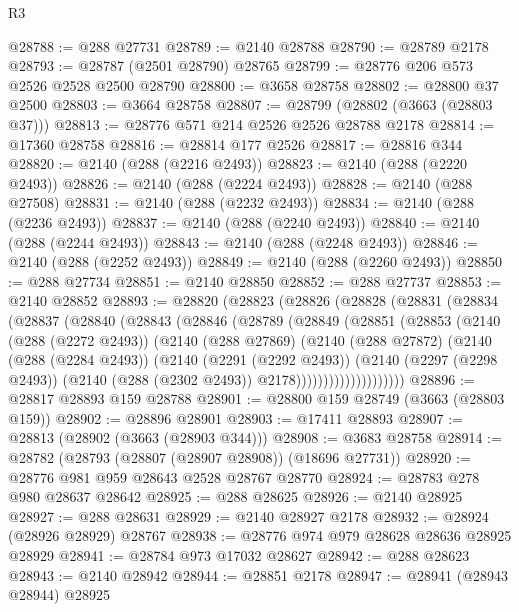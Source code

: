 \begin{lexlean}{R3}
\begin{coremodule}
@28788 := @288 @27731
@28789 := @2140 @28788
@28790 := @28789 @2178
@28793 := @28787 (@2501 @28790) @28765
@28799 := @28776 @206 @573 @2526 @2528 @2500 @28790
@28800 := @3658 @28758
@28802 := @28800 @37 @2500
@28803 := @3664 @28758
@28807 := @28799 (@28802 (@3663 (@28803 @37)))
@28813 := @28776 @571 @214 @2526 @2526 @28788 @2178
@28814 := @17360 @28758
@28816 := @28814 @177 @2526
@28817 := @28816 @344
@28820 := @2140 (@288 (@2216 @2493))
@28823 := @2140 (@288 (@2220 @2493))
@28826 := @2140 (@288 (@2224 @2493))
@28828 := @2140 (@288 @27508)
@28831 := @2140 (@288 (@2232 @2493))
@28834 := @2140 (@288 (@2236 @2493))
@28837 := @2140 (@288 (@2240 @2493))
@28840 := @2140 (@288 (@2244 @2493))
@28843 := @2140 (@288 (@2248 @2493))
@28846 := @2140 (@288 (@2252 @2493))
@28849 := @2140 (@288 (@2260 @2493))
@28850 := @288 @27734
@28851 := @2140 @28850
@28852 := @288 @27737
@28853 := @2140 @28852
@28893 := @28820
    (@28823
      (@28826
        (@28828
          (@28831
            (@28834
              (@28837
                (@28840
                  (@28843
                    (@28846
                      (@28789
                        (@28849
                          (@28851
                            (@28853
                              (@2140
                                (@288 (@2272 @2493))
                                (@2140
                                  (@288 @27869)
                                  (@2140
                                    (@288 @27872)
                                    (@2140
                                      (@288 (@2284 @2493))
                                      (@2140
                                        (@2291 (@2292 @2493))
                                        (@2140
                                          (@2297 (@2298 @2493))
                                          (@2140 (@288 (@2302 @2493)) @2178))))))))))))))))))))
@28896 := @28817 @28893 @159 @28788
@28901 := @28800 @159 @28749 (@3663 (@28803 @159))
@28902 := @28896 @28901
@28903 := @17411 @28893
@28907 := @28813 (@28902 (@3663 (@28903 @344)))
@28908 := @3683 @28758
@28914 := @28782 (@28793 (@28807 (@28907 @28908)) (@18696 @27731))
@28920 := @28776 @981 @959 @28643 @2528 @28767 @28770
@28924 := @28783 @278 @980 @28637 @28642
@28925 := @288 @28625
@28926 := @2140 @28925
@28927 := @288 @28631
@28929 := @2140 @28927 @2178
@28932 := @28924 (@28926 @28929) @28767
@28938 := @28776 @974 @979 @28628 @28636 @28925 @28929
@28941 := @28784 @973 @17032 @28627
@28942 := @288 @28623
@28943 := @2140 @28942
@28944 := @28851 @2178
@28947 := @28941 (@28943 @28944) @28925

\end{coremodule}
\end{lexlean}
